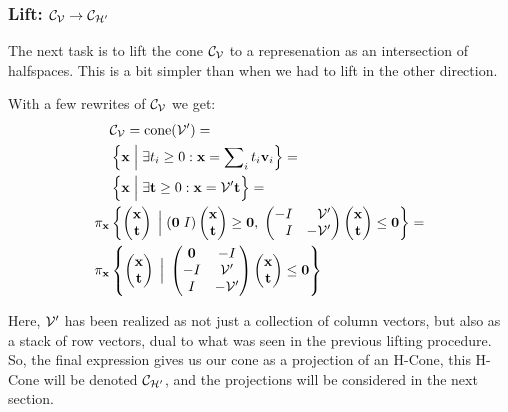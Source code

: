 \subsubsection{Lift: $\mathcal{C}_{\mathcal{V}} \to \mathcal{C}_{\mathcal{H'}}$}
The next task is to lift the cone $\mathcal{C}_{\mathcal{V}}$ to a represenation as an intersection of halfspaces.  This is a bit simpler than when we had to lift in the other direction.  

With a few rewrites of $\mathcal{C}_{\mathcal{V}}$ we get:
\begin{align*}
& \CV = \cone(\V') = \\
& \left\{ \x \Suchthat \exists t_i \geq 0 : \x = \sum\nolimits_i t_i \v_i\right\} = \\
& \left\{ \x \Suchthat \exists \t \geq 0 : \x = \V' \t \right\} = \\
\pi_{\x} & \left\{ \stack{\x}{\t} \Suchthat 
    (\vec{0}\; I) \stack{\x}{\t} \geq \vec{0},\;
    \begin{pmatrix*}[r] -I & \V' \\ I & -\V' \end{pmatrix*}
       \stack{\x}{\t} \leq \vec{0}
       \right\} = \\
 \pi_{\x} & \left\{ \stack{\x}{\t} \Suchthat  
\begin{pmatrix}
\vec{0} & -I  \\
-I      & \V' \\
I       & -\V'
\end{pmatrix}
  \stack{\x}{\t} \leq \vec{0}
\right\}
\end{align*}

Here, $\mathcal{V}'$ has been realized as not just a collection of column vectors, but also as a stack of row vectors, dual to what was seen in the previous lifting procedure.  So, the final expression gives us our cone as a projection of an H-Cone, this H-Cone will be denoted $\mathcal{C}_{\mathcal{H'}}$, and the projections will be considered in the next section.

